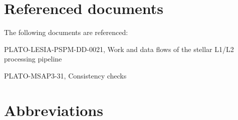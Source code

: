 \documentclass[a4paper, oneside, 11pt, article, english]{memoir}
\begin{document}
\section{Referenced documents}
\label{sec:docs}

The following documents are referenced:

\begin{description}
  \firmlist
\item[RD1] PLATO-LESIA-PSPM-DD-0021, Work and data flows of the stellar L1/L2 processing pipeline
\item[MSAP3-31] PLATO-MSAP3-31, Consistency checks
\end{description}

\begin{description}
  \firmlist
\end{description}


\section{Abbreviations}
\label{sec:abbrev}

\end{document}
